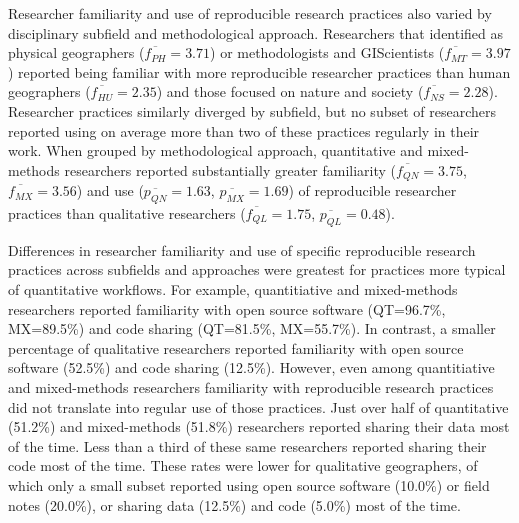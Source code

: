 \documentclass[]{interact}
\theoremstyle{plain}%
\theoremstyle{definition}
\theoremstyle{remark}
\begin{document}
Researcher familiarity and use of reproducible research practices also varied by disciplinary subfield and methodological approach. 
Researchers that identified as physical geographers ($\overline{f_{PH}}=3.71$) or methodologists and GIScientists ($\overline{f_{MT}}=3.97$) reported being familiar with more reproducible researcher practices than human  geographers ($\overline{f_{HU}}=2.35$) and those focused on nature and society ($\overline{f_{NS}}=2.28$).
Researcher practices similarly diverged by subfield, but no subset of researchers reported using on average more than two of these practices regularly in their work.  
When grouped by methodological approach, quantitative and mixed-methods researchers reported substantially greater familiarity ($\overline{f_{QN}}=3.75$, $\overline{f_{MX}}=3.56$) and use ($\overline{p_{QN}}=1.63$, $\overline{p_{MX}}=1.69$) of reproducible researcher practices than qualitative researchers ($\overline{f_{QL}}=1.75$, $\overline{p_{QL}}=0.48$).

Differences in researcher familiarity and use of specific reproducible research practices across subfields and approaches were greatest for practices more typical of quantitative workflows. 
For example, quantitiative and mixed-methods researchers reported familiarity with open source software (QT=96.7\%, MX=89.5\%) and code sharing (QT=81.5\%, MX=55.7\%).
In contrast, a smaller percentage of qualitative researchers reported familiarity with open source software (52.5\%) and code sharing (12.5\%).
However, even among quantitiative and mixed-methods researchers familiarity with reproducible research practices did not translate into regular use of those practices.
Just over half of quantitative (51.2\%) and mixed-methods (51.8\%) researchers reported sharing their data most of the time.
Less than a third of these same researchers reported sharing their code most of the time. 
These rates were lower for qualitative geographers, of which only a small subset reported using open source software (10.0\%) or field notes (20.0\%), or sharing data (12.5\%) and code (5.0\%) most of the time.
\end{document}
